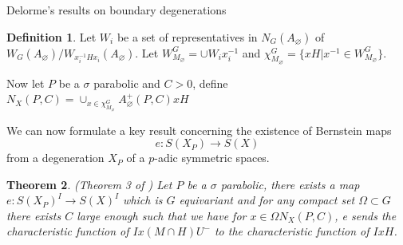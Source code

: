 \documentclass[12pt]{article}
\newcommand{\<}{\langle}
\renewcommand{\>}{\rangle}
\renewcommand{\emptyset}{\varnothing}
\theoremstyle{plain}
\newtheorem{theorem}{Theorem}[section]
\theoremstyle{definition}
\newtheorem{defn}[theorem]{Definition}
\begin{document}
\begin{subsection}{Delorme's results on boundary degenerations}
\begin{defn}
    Let $W_i$ be a set of representatives in $N_G(A_\emptyset)$
    of $W_G(A_\emptyset)/W_{x^{-1}_iHx_i}(A_\emptyset)$. Let $W^G_{M_\emptyset}=\cup W_ix^{-1}_i$ and $\chi^G_{M_\emptyset}=\{xH|x^{-1}\in W^G_{M_\emptyset}\}$.

    Now let $P$ be a $\sigma$ parabolic and $C>0$, define $N_X(P,C)=\cup_{x\in \chi^G_{M_\emptyset}}A_\emptyset^+(P,C)xH$
\end{defn}

We can now formulate a key result concerning the existence of Bernstein maps $$e:S(X_P) \rightarrow S(X)$$  from a degeneration $X_P$ of a $p$-adic symmetric spaces.

\begin{theorem}{(Theorem 3 of \cite{NeighborhoodsInf})}
\label{theorem3}
    Let $P$ be a $\sigma$ parabolic, there exists a map $e:S(X_P)^I\rightarrow S(X)^I$ which is $G$ equivariant and for any compact set $\Omega\subset G$ there exists $C$ large enough such that we have for $x\in \Omega N_X(P,C)$, e sends the characteristic function of $Ix(M\cap H)U^-$ to the characteristic function of $IxH$.
\end{theorem}

\end{subsection}
\end{document}
